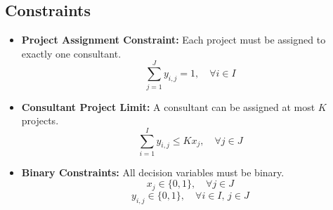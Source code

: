 \documentclass{article}
\begin{document}
\subsection*{Constraints}
\begin{itemize}
    \item \textbf{Project Assignment Constraint:} Each project must be assigned to exactly one consultant.
    \begin{equation}
        \sum_{j=1}^{J} y_{i,j} = 1, \quad \forall i \in I
    \end{equation}

    \item \textbf{Consultant Project Limit:} A consultant can be assigned at most $K$ projects.
    \begin{equation}
        \sum_{i=1}^{I} y_{i,j} \leq K x_j, \quad \forall j \in J
    \end{equation}

    \item \textbf{Binary Constraints:} All decision variables must be binary.
    \begin{equation}
        x_j \in \{0, 1\}, \quad \forall j \in J
    \end{equation}
    \begin{equation}
        y_{i,j} \in \{0, 1\}, \quad \forall i \in I, \, j \in J
    \end{equation}
\end{itemize}
\end{document}
